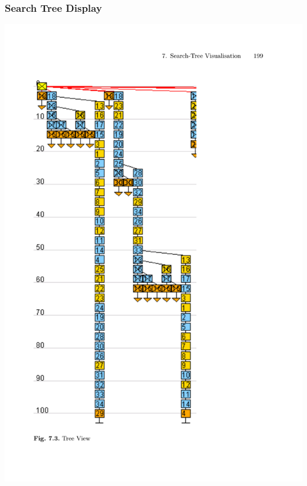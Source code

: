 \documentclass[dvipsnames,aspectratio=169]{beamer}
\begin{document}
\begin{frame}
  \frametitle{Search Tree Display %
  \cite{DBLP:conf/discipl/SimonisA00} \cite{DBLP:journals/constraints/FagesSC04}}
  
  \includegraphics[height=0.8\textheight]{images/simonis_aggoun_tree.pdf}

\end{frame}
\end{document}
